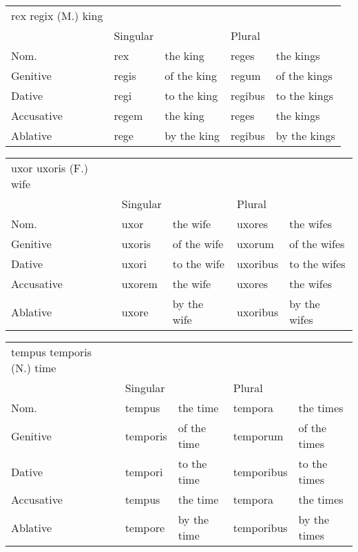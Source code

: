 \begin{center}  
  \begin{tabular}{lllll}
    \\
    rex regix (M.) king & & & \\
    & Singular & & Plural &  \\
    Nom. & rex  & the king & reges & the kings \\
    Genitive & regis& of the king & regum & of the kings\\ 
    Dative & regi & to the king & regibus & to the kings \\
    Accusative & regem & the king & reges & the kings \\ 
    Ablative & rege  & by the king & regibus & by the kings\\ 
  \end{tabular}
\end{center}
\begin{center}  
  \begin{tabular}{lllll}
    \\
    uxor uxoris (F.) wife & & & \\
    & Singular & & Plural &  \\
    Nom. & uxor & the wife & uxores & the wifes \\
    Genitive & uxoris & of the wife & uxorum & of the wifes \\ 
    Dative & uxori & to the wife & uxoribus & to the wifes\\
    Accusative & uxorem & the wife & uxores & the wifes\\ 
    Ablative & uxore & by the wife & uxoribus & by the wifes \\ 
  \end{tabular}
\end{center}
\begin{center}  
  \begin{tabular}{lllll}
    \\
    tempus temporis (N.) time & & & \\
    & Singular & & Plural &  \\
    Nom. & tempus & the time & tempora & the times \\
    Genitive & temporis & of the time & temporum & of the times \\ 
    Dative & tempori & to the time & temporibus & to the times\\
    Accusative & tempus & the time & tempora & the times \\ 
    Ablative & tempore & by the time & temporibus & by the times \\ 
  \end{tabular}
\end{center}
